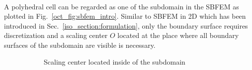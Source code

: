\paragraph{}
A polyhedral cell can be regarded as one of the subdomain in the SBFEM as plotted in Fig.~\ref{oct_fig:sbfem_intro}.
Similar to SBFEM in 2D which has been introduced in Sec.~\ref{iso_section:formulation}, only the boundary surface requires discretization and a scaling center $O$ located at the place where all boundary surfaces of the subdomain are visible is necessary.

\begin{figure}
    \centering
    \begin{subfigure}[b]{0.48\linewidth}
        \caption{Scaling center located inside of the subdomain}
        \label{oct_fig:sbfem_intro_a}
    \end{subfigure}
    \begin{subfigure}[b]{0.48\linewidth}
        \scalebox{0.5}{
}
\end{subfigure}
\end{figure}
